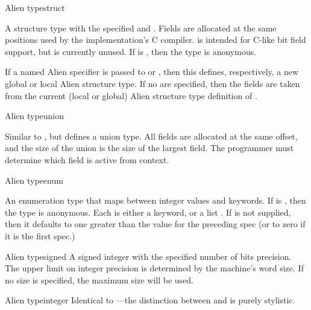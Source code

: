 \begin{deftp}{Alien type}{struct}{ 
    }
  
  A structure type with the specified  and .
  Fields are allocated at the same positions used by the
  implementation's C compiler.   is intended for C-like bit
  field support, but is currently unused.  If  is \false,
  then the type is anonymous.
  
  If a named Alien  specifier is passed to
   or , then this defines,
  respectively, a new global or local Alien structure type.  If no
   are specified, then the fields are taken from the
  current (local or global) Alien structure type definition of
  .
\end{deftp}

\begin{deftp}{Alien type}{union}{ 
    }
  
  Similar to , but defines a union type.  All fields are
  allocated at the same offset, and the size of the union is the size
  of the largest field.  The programmer must determine which field is
  active from context.
\end{deftp}

\begin{deftp}{Alien type}{enum}{ }
  
  An enumeration type that maps between integer values and keywords.
  If  is \false, then the type is anonymous.  Each
   is either a keyword, or a list .  If  is not supplied, then it defaults
  to one greater than the value for the preceding spec (or to zero if
  it is the first spec.)
\end{deftp}

\begin{deftp}{Alien type}{signed}{}  
  A signed integer with the specified number of bits precision.  The
  upper limit on integer precision is determined by the machine's word
  size.  If no size is specified, the maximum size will be used.
\end{deftp}

\begin{deftp}{Alien type}{integer}{}  
  Identical to ---the distinction between 
  and  is purely stylistic.
\end{deftp}

